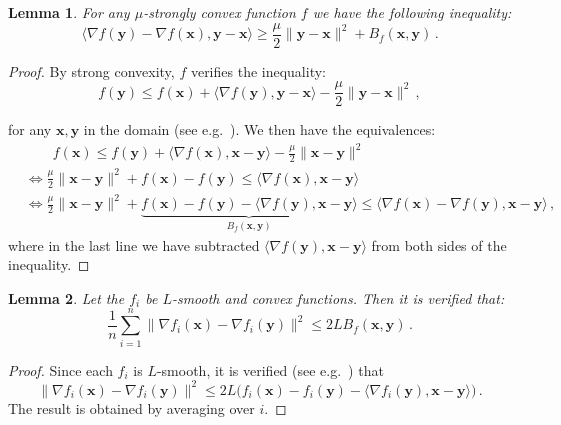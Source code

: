 \documentclass{article}
\def\xx{{\boldsymbol x}}
\def\yy{{\boldsymbol y}}
\newtheorem{lemma}{Lemma}
\begin{document}
\begin{lemma}\label{lemma:neseterov_inequality}For any $\mu$-strongly convex function $f$ we have the following inequality:
\begin{equation}
\langle \nabla f(\yy) - \nabla f(\xx), \yy - \xx\rangle \geq \frac{\mu }{2}\|\yy - \xx\|^2  + B_f(\xx, \yy) \, .
\end{equation}

\end{lemma}
\begin{proof} By strong convexity, $f$ verifies the inequality:
  \begin{equation}\label{eq:strongconvex}
	f(\yy) \leq f(\xx) + \langle \nabla f(\yy), \yy - \xx \rangle - \frac{\mu}{2}\|\yy - \xx\|^2 \, ,
  \end{equation}

  for any $\xx, \yy$ in the domain (see e.g.~\citep{nesterov2004introductory}). We then have the equivalences:
\begin{align}
  &\qquad     f(\xx) \leq f(\yy) + \langle \nabla f(\xx), \xx - \yy \rangle - \frac{\mu}{2}\|\xx - \yy\|^2 \nonumber \\
  &\iff \frac{\mu}{2}\|\xx - \yy\|^2 + f(\xx) - f(\yy) \leq \langle \nabla f(\xx), \xx - \yy \rangle \nonumber \\
  &\iff \frac{\mu}{2}\|\xx - \yy\|^2 + \underbrace{f(\xx) - f(\yy) - \langle \nabla f(\yy), \xx - \yy\rangle}_{B_f(\xx, \yy)} \leq \langle \nabla f(\xx) - \nabla f(\yy), \xx - \yy \rangle \,,
\end{align}
  where in the last line we have subtracted $\langle \nabla f(\yy), \xx - \yy\rangle$ from both sides of the inequality.
\end{proof}

\hfill

\begin{lemma}\label{lemma:l_smooth_ineq}
  Let the $f_i$ be $L$-smooth and convex functions.
  Then it is verified that:
\begin{equation}
\frac{1}{n}\sum_{i=1}^n\|\nabla f_i(\xx) - \nabla f_i(\yy)\|^2 \leq 2 L B_f(\xx, \yy)\,.
\end{equation}
\end{lemma}

\begin{proof}
Since each $f_i$ is $L$-smooth, it is verified (see e.g.~\citet[Theorem 2.1.5]{nesterov2004introductory}) that
\begin{equation}
\|\nabla f_i(\xx) - \nabla f_i(\yy)\|^2 \leq 2 L \big(f_i(\xx) - f_i(\yy) - \langle \nabla f_i(\yy), \xx - \yy\rangle\big)\,.
\end{equation}
The result is obtained by averaging over $i$.
\end{proof}
\end{document}
